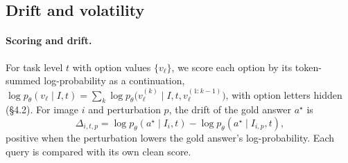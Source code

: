 

\subsection{Drift and volatility}
\label{sec:drift}

\paragraph{Scoring and drift.}
For task level $t$ with option values $\{v_\ell\}$, we score each option
by its token-summed log-probability as a continuation,
$\log p_\theta(v_\ell\mid I,t)=\sum_k \log p_\theta\big(v_\ell^{(k)}\mid
I,t,v_\ell^{(1:k-1)}\big)$, with option letters hidden (\S4.2). For
image $i$ and perturbation $p$, the drift of the gold answer $a^\star$ is
\begin{equation}
  \Delta_{i,t,p} = \log p_\theta(a^\star\mid I_i,t)
                 - \log p_\theta(a^\star\mid I_{i,p},t),
  \label{eq:drift}
\end{equation}
positive when the perturbation lowers the gold answer's
log-probability. Each query is compared with its own clean score.

